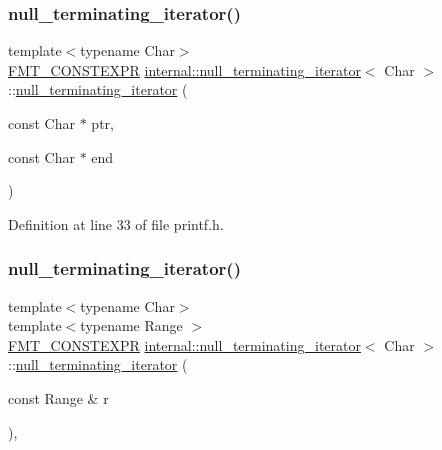 \subsubsection{\texorpdfstring{null\+\_\+terminating\+\_\+iterator()}{null\_terminating\_iterator()}\hspace{0.1cm}{\footnotesize\ttfamily [2/3]}}
{\footnotesize\ttfamily template$<$typename Char$>$ \\
\hyperlink{core_8h_a69201cb276383873487bf68b4ef8b4cd}{F\+M\+T\+\_\+\+C\+O\+N\+S\+T\+E\+X\+PR} \hyperlink{classinternal_1_1null__terminating__iterator}{internal\+::null\+\_\+terminating\+\_\+iterator}$<$ Char $>$\+::\hyperlink{classinternal_1_1null__terminating__iterator}{null\+\_\+terminating\+\_\+iterator} (\begin{DoxyParamCaption}\item[{const Char $\ast$}]{ptr,  }\item[{const Char $\ast$}]{end }\end{DoxyParamCaption})\hspace{0.3cm}{\ttfamily [inline]}}



Definition at line 33 of file printf.\+h.

\mbox{\label{classinternal_1_1null__terminating__iterator_a791a9850a8ccc184bb925f84ccaafb5e}} 
\subsubsection{\texorpdfstring{null\+\_\+terminating\+\_\+iterator()}{null\_terminating\_iterator()}\hspace{0.1cm}{\footnotesize\ttfamily [3/3]}}
{\footnotesize\ttfamily template$<$typename Char$>$ \\
template$<$typename Range $>$ \\
\hyperlink{core_8h_a69201cb276383873487bf68b4ef8b4cd}{F\+M\+T\+\_\+\+C\+O\+N\+S\+T\+E\+X\+PR} \hyperlink{classinternal_1_1null__terminating__iterator}{internal\+::null\+\_\+terminating\+\_\+iterator}$<$ Char $>$\+::\hyperlink{classinternal_1_1null__terminating__iterator}{null\+\_\+terminating\+\_\+iterator} (\begin{DoxyParamCaption}\item[{const Range \&}]{r }\end{DoxyParamCaption})\hspace{0.3cm}{\ttfamily [inline]}, {\ttfamily [explicit]}}



